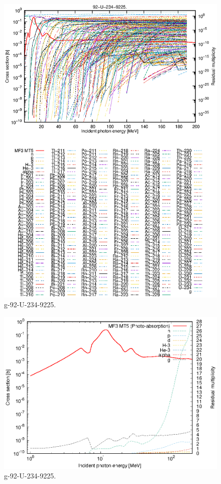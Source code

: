 \begin{figure}
 \includegraphics[width=\linewidth]{eps/g_92-U-234_9225.eps}
  \caption{g-92-U-234-9225.}
\end{figure}
\newpage \clearpage

\begin{figure}
 \includegraphics[width=\linewidth]{eps-log/g_92-U-234_9225.eps}
 \caption{g-92-U-234-9225.}
\end{figure}
\newpage \clearpage

